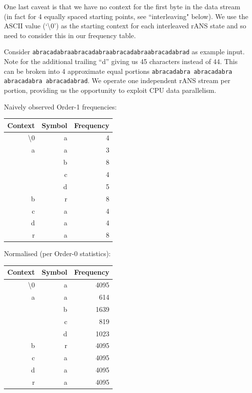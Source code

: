 \documentclass[a4paper]{article}
\begin{document}
One last caveat is that we have no context for the first byte in the
data stream (in fact for 4 equally spaced starting points, see
``interleaving" below).  We use the ASCII value (`\textbackslash0') as
the starting context for each interleaved rANS state and so need to
consider this in our frequency table.

Consider \texttt{abracadabraabracadabraabracadabraabracadabrad} as
example input.  Note for the additional trailing ``d'' giving us 45
characters instead of 44.  This can be broken into 4 approximate equal
portions \texttt{abracadabra abracadabra abracadabra abracadabrad}.  We
operate one independent rANS stream per portion, providing us the
opportunity to exploit CPU data parallelism.

\begin{minipage}[t]{0.5\textwidth}
Naively observed Order-1 frequencies:
\\[8pt]
\begin{tabular}{ |r|r|r| }
\hline
Context & Symbol & Frequency\\
\hline
\textbackslash0 & a & 4 \\
\hline
a & a & 3 \\
  & b & 8 \\
  & c & 4 \\
  & d & 5 \\
\hline
b & r & 8 \\
\hline
c & a & 4 \\
\hline
d & a & 4 \\
\hline
r & a & 8 \\
\hline
\end{tabular}
\end{minipage}
\begin{minipage}[t]{0.5\textwidth}
Normalised (per Order-0 statistics):
\\[8pt]
\begin{tabular}{ |r|r|r|}
\hline
Context & Symbol & Frequency\\
\hline
\textbackslash0 & a & 4095 \\
\hline
a & a &  614 \\
  & b & 1639 \\
  & c &  819 \\
  & d & 1023 \\
\hline
b & r & 4095 \\
\hline
c & a & 4095 \\
\hline
d & a & 4095 \\
\hline
r & a & 4095 \\
\hline
\end{tabular}
\end{minipage}
\end{document}
